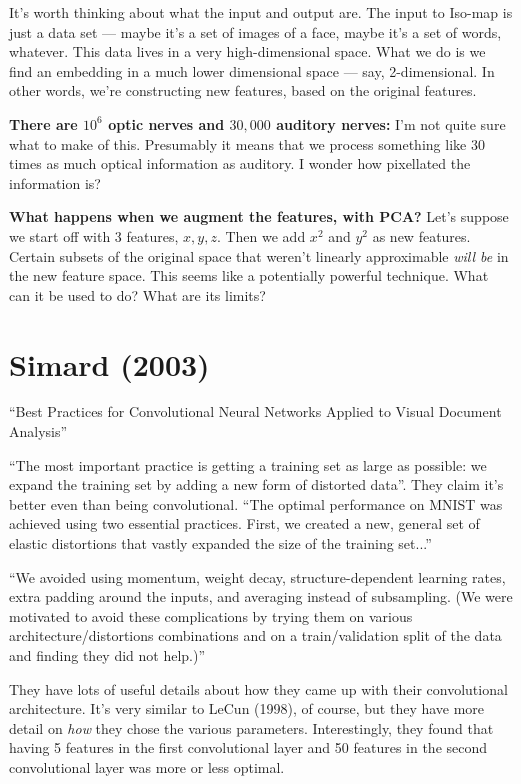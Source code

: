 \documentclass[12pt]{report}
\begin{document}
It's worth thinking about what the input and output are.  The input to
Iso-map is just a data set --- maybe it's a set of images of a face,
maybe it's a set of words, whatever.  This data lives in a very
high-dimensional space.  What we do is we find an embedding in a much
lower dimensional space --- say, 2-dimensional.  In other words, we're
constructing new features, based on the original features.

\textbf{There are $10^6$ optic nerves and $30,000$ auditory nerves:}
I'm not quite sure what to make of this.  Presumably it means that we
process something like $30$ times as much optical information as
auditory.  I wonder how pixellated the information is?  

\textbf{What happens when we augment the features, with PCA?}  Let's
suppose we start off with 3 features, $x, y, z$.  Then we add $x^2$
and $y^2$ as new features.  Certain subsets of the original space that
weren't linearly approximable \emph{will be} in the new feature space.
This seems like a potentially powerful technique.  What can it be used
to do?  What are its limits?

\section{Simard (2003)}

``Best Practices for Convolutional Neural Networks Applied to Visual
Document Analysis''

``The most important practice is getting a training set as large as
possible: we expand the training set by adding a new form of distorted
data''.  They claim it's better even than being convolutional.  ``The
optimal performance on MNIST was achieved using two essential
practices.  First, we created a new, general set of elastic
distortions that vastly expanded the size of the training set...''

``We avoided using momentum, weight decay, structure-dependent
learning rates, extra padding around the inputs, and averaging instead
of subsampling. (We were motivated to avoid these complications by
trying them on various architecture/distortions combinations and on a
train/validation split of the data and finding they did not help.)''

They have lots of useful details about how they came up with their
convolutional architecture.  It's very similar to LeCun (1998), of
course, but they have more detail on \emph{how} they chose the various
parameters.  Interestingly, they found that having 5 features in the
first convolutional layer and 50 features in the second convolutional
layer was more or less optimal.
\end{document}
